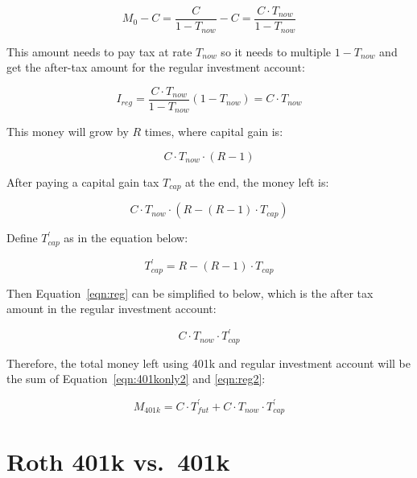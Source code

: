 \documentclass[twocolumn]{article}
\begin{document}
\begin{equation}
  M_{0} - C = \frac{C}{1 - T_{now}} - C = \frac{C \cdot T_{now}}{1 - T_{now}} \label{eqn:m4}
\end{equation}

This amount needs to pay tax at rate $T_{now}$ so it needs to multiple
$1-T_{now}$ and get the after-tax amount for the regular investment account:

\begin{equation}
  I_{reg} = \frac{C \cdot T_{now}}{1 - T_{now}} (1 - T_{now}) = C \cdot T_{now}
\end{equation}

This money will grow by $R$ times, where capital gain is:

\begin{equation}
  C \cdot T_{now} \cdot (R - 1) \label{eqn:reg}
\end{equation}

After paying a capital gain tax $T_{cap}$ at the end, the money left is:

\begin{equation}
  C \cdot T_{now} \cdot (R - (R - 1) \cdot T_{cap}) \label{eqn:reg}
\end{equation}

Define $T_{cap}^{\prime}$ as in the equation below:

\begin{equation}
  T_{cap}^{\prime} = R - (R - 1) \cdot T_{cap} \label{eqn:capp}
\end{equation}

Then Equation~\ref{eqn:reg} can be simplified to below, which is the after tax amount in the regular investment account:

\begin{equation}
  C \cdot T_{now} \cdot T_{cap}^{\prime} \label{eqn:reg2}
\end{equation}

Therefore, the total money left using 401k and regular investment account will
be the sum of Equation~\ref{eqn:401konly2} and \ref{eqn:reg2}:

\begin{equation}
  M_{401k} = C \cdot T_{fut}^{\prime} + C \cdot T_{now} \cdot T_{cap}^{\prime} \label{eqn:401k}
\end{equation}

\section{Roth 401k vs.\ 401k}
\end{document}

